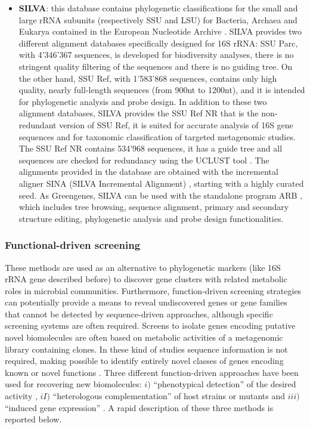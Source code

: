 \begin{itemize}
\item \textbf{SILVA}: this database contains phylogenetic classifications for the small and large rRNA subunits (respectively SSU and LSU) for Bacteria, Archaea and Eukarya contained in the European Nucleotide Archive \cite{leinonen2010european}. SILVA provides two different alignment databases specifically designed for 16S rRNA: SSU Parc, with 4'346'367 sequences, is developed for biodiversity analyses, there is no stringent quality filtering of the sequences and there is no guiding tree. On the other hand, SSU Ref, with 1'583'868 sequences, contains only high quality, nearly full-length sequences (from 900nt to 1200nt), and it is intended for phylogenetic analysis and probe design. In addition to these two alignment databases, SILVA provides the SSU Ref NR that is the non-redundant version of SSU Ref, it is suited for accurate analysis of 16S gene sequences and for taxonomic classification of targeted metagenomic studies. The SSU Ref NR contains 534'968 sequences, it has a guide tree and all sequences are checked for redundancy using the UCLUST tool \cite{edgar2010search}. The alignments provided in the database are obtained with the incremental aligner SINA (SILVA Incremental Alignment) \cite{pruesse2012sina}, starting with a highly curated seed. As Greengenes, SILVA can be used with the standalone program ARB \cite{ludwig2004arb}, which includes tree browsing, sequence alignment, primary and secondary structure editing, phylogenetic analysis and probe design functionalities. 
\end{itemize}

\subsubsection{Functional-driven screening}
These methods are used as an alternative to phylogenetic markers (like 16S rRNA gene described before) to discover gene clusters with related metabolic roles in microbial communities. Furthermore, function-driven screening strategies can potentially provide a means to reveal undiscovered genes or gene families that cannot be detected by sequence-driven approaches, although specific screening systems are often required. Screens to isolate genes encoding putative novel biomolecules are often based on metabolic activities of a metagenomic library containing clones. In these kind of studies sequence information is not required, making possible to identify entirely novel classes of genes encoding known or novel functions \cite{ferrer2008metagenomics, handelsman2004metagenomics}. Three different function-driven approaches have been used for recovering new biomolecules: $i)$ ``phenotypical detection'' of the desired activity \cite{beloqui2010diversity}, $iI)$ ``heterologous complementation'' of host strains or mutants \cite{simon2009rapid} and $iii)$ ``induced gene expression'' \cite{uchiyama2004substrate}. A rapid description of these three methods is reported below.\\

